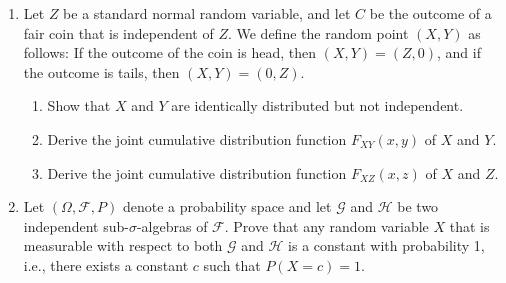 \begin{enumerate}
\item Let $Z$ be a standard normal random variable, and let $C$ be the outcome of a fair coin that is independent of $Z$. We define the random point $(X,Y)$ as follows: If the outcome of the coin is head, then $(X,Y)=(Z,0)$, and if the outcome is tails, then $(X,Y)=(0,Z)$.
\begin{enumerate}
\item Show that $X$ and $Y$ are identically distributed but not independent.
\item Derive the joint cumulative distribution function $F_{XY}(x,y)$ of $X$ and $Y$.
\item Derive the joint cumulative distribution function $F_{XZ}(x,z)$ of $X$ and $Z$.
\end{enumerate}
\item Let $(\Omega, \mathcal{F}, P)$ denote a probability space and let $\mathcal{G}$ and $\mathcal{H}$ be two independent sub-$\sigma$-algebras of $\mathcal{F}$. Prove that any random variable $X$ that is measurable with respect to both $\mathcal{G}$ and $\mathcal{H}$ is a constant with probability 1, i.e., there exists a constant $c$ such that $P(X=c)=1$.
\end{enumerate}
